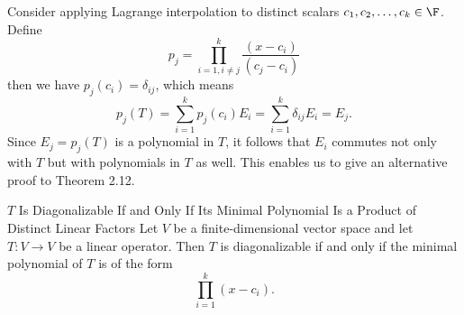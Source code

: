 \documentclass[linearalgebraII]{subfiles}
\begin{document}
    \begin{remark}
        Consider applying Lagrange interpolation to distinct scalars $c_1, c_2, \ldots, c_k\in \F$. Define
        \begin{equation*}
            p_j = \prod^{k}_{i=1,i\neq j} \frac{(x-c_i)}{(c_j-c_i)}
        \end{equation*}
        then we have $p_j(c_i) = \delta_{ij}$, which means
        \begin{equation*}
            p_j(T) = \sum^{k}_{i=1} p_j(c_i)E_i = \sum^{k}_{i=1} \delta_{ij}E_i = E_j.
        \end{equation*}
        Since $E_j = p_j(T)$ is a polynomial in $T$, it follows that $E_i$ commutes not only with $T$ but with polynomials in $T$ as well. This enables us to give an alternative proof to Theorem 2.12.
    \end{remark}

    \setcounter{stcounter}{11}
    \begin{theorem}{$T$ Is Diagonalizable If and Only If Its Minimal Polynomial Is a Product of Distinct Linear Factors}
        Let $V$ be a finite-dimensional vector space and let $T:V\to V$ be a linear operator. Then $T$ is diagonalizable if and only if the minimal polynomial of $T$ is of the form
        \begin{equation*}
            \prod^{k}_{i=1} (x-c_i).
        \end{equation*}
    \end{theorem}
    \setcounter{stcounter}{17}
\end{document}

